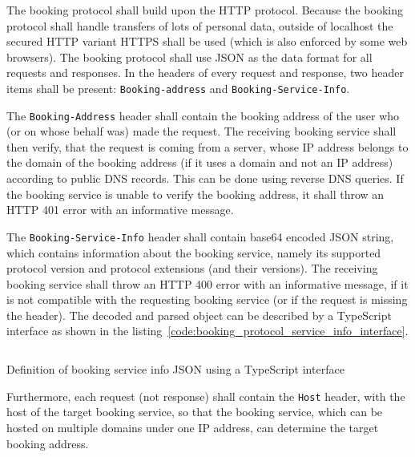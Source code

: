 The booking protocol shall build upon the HTTP protocol. Because the booking protocol shall handle transfers of lots of personal data, outside of localhost the secured HTTP variant HTTPS shall be used (which is also enforced by some web browsers). The booking protocol shall use JSON as the data format for all requests and responses. In the headers of every request and response, two header items shall be present: \texttt{Booking-address} and \texttt{Booking-Service-Info}.

The \texttt{Booking-Address} header shall contain the booking address of the user who (or on whose behalf was) made the request. The receiving booking service shall then verify, that the request is coming from a server, whose IP address belongs to the domain of the booking address (if it uses a domain and not an IP address) according to public DNS records. This can be done using reverse DNS queries. If the booking service is unable to verify the booking address, it shall throw an HTTP 401 error with an informative message.

The \texttt{Booking-Service-Info} header shall contain base64 encoded JSON string, which contains information about the booking service, namely its supported protocol version and protocol extensions (and their versions). The receiving booking service shall throw an HTTP 400 error with an informative message, if it is not compatible with the requesting booking service (or if the request is missing the header). The decoded and parsed object can be described by a TypeScript interface as shown in the listing~\ref{code:booking_protocol_service_info_interface}.

\begin{listing}
    \inputminted[breaklines]{typescript}{content/design/booking_protocol_service_info_interface.ts}
    \caption{Definition of booking service info JSON using a TypeScript interface}
    \label{code:booking_protocol_service_info_interface}
\end{listing}

Furthermore, each request (not response) shall contain the \texttt{Host} header, with the host of the target booking service, so that the booking service, which can be hosted on multiple domains under one IP address, can determine the target booking address.

